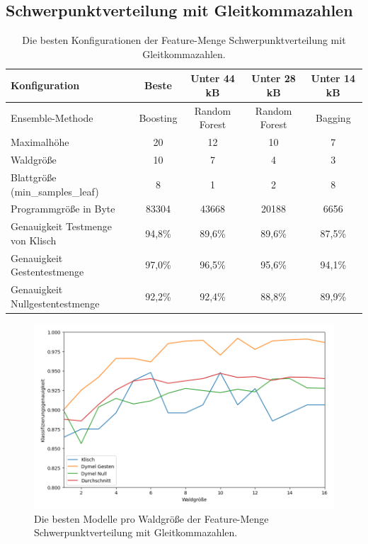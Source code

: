 \subsection{Schwerpunktverteilung mit Gleitkommazahlen}
\begin{table}[h!]
    \hspace{-0.75cm}
    \begin{tabular}{ | l | c | c | c | c |}
        \hline
        Konfiguration & Beste & Unter 44 kB & Unter 28 kB & Unter 14 kB \\\hline
        Ensemble-Methode & Boosting & Random Forest & Random Forest & Bagging  \\\hline
        Maximalhöhe & 20 & 12 & 10 & 7 \\\hline
        Waldgröße & 10 & 7 & 4 & 3 \\\hline
        Blattgröße (min\_samples\_leaf) & 8 & 1 & 2 & 8 \\\hline
        Programmgröße in Byte & 83304 & 43668 & 20188 & 6656 \\\hline
        Genauigkeit Testmenge von Klisch & 94,8\% & 89,6\% & 89,6\% & 87,5\% \\\hline
        Genauigkeit Gestentestmenge & 97,0\% & 96,5\% & 95,6\% & 94,1\% \\\hline
        Genauigkeit Nullgestentestmenge & 92,2\% & 92,4\% & 88,8\% & 89,9\% \\\hline
    \end{tabular}
    \caption{Die besten Konfigurationen der Feature-Menge Schwerpunktverteilung mit Gleitkommazahlen.}
    \label{tab:schwerpunktverteilung_float}
\end{table}
\begin{figure}[h!]
    \centering
    \includegraphics[width=\linewidth]{images/cocd_float_acc_per_size.png}
    \caption{Die besten Modelle pro Waldgröße der Feature-Menge Schwerpunktverteilung mit Gleitkommazahlen.}
    \label{fig:cocd_float_per_forest_size}
\end{figure}
